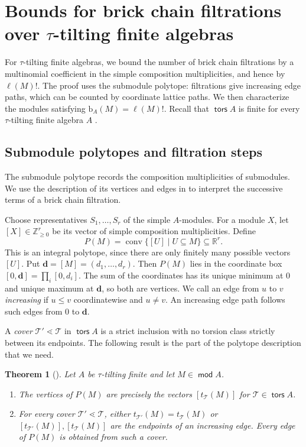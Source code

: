 \documentclass[a4paper,reqno,10pt]{amsart}
\newtheorem{theorem}{Theorem}[section]
\theoremstyle{definition}
\numberwithin{equation}{section}
\DeclareMathOperator{\tors}{\mathsf{tors}}
\DeclareMathOperator{\modu}{\mathsf{mod}}
\newcommand{\T}{\mathcal T}
\newcommand{\bcount}{\mathrm b}
\begin{document}
\section{Bounds for brick chain filtrations over \texorpdfstring{$\tau$}{tau}-tilting finite algebras}\label{sec:finite-type}

For $\tau$-tilting finite algebras, we bound the number of brick chain
filtrations by a multinomial coefficient in the simple composition
multiplicities, and hence by $\ell(M)!$. The proof uses the submodule
polytope: filtrations give increasing edge paths, which can be counted
by coordinate lattice paths. We then characterize the modules satisfying
$\bcount_A(M)=\ell(M)!$.
Recall that $\tors A$ is finite for every $\tau$-tilting finite algebra
$A$ \cite[Theorem~3.8]{DIJ}.

\subsection{Submodule polytopes and filtration steps}

The submodule polytope records the composition multiplicities of
submodules. We use the description of its vertices and edges in
\cite[Section~5.3]{AHIKM} to interpret the successive terms of a
brick chain filtration.

Choose representatives $S_1,\ldots,S_r$ of the simple $A$-modules.
For a module $X$, let $[X]\in\mathbb Z_{\geq0}^r$ be its vector of
simple composition multiplicities. Define
\[
 P(M)=\operatorname{conv}\{[U]\mid U\subseteq M\}
       \subseteq\mathbb R^r.
\]
This is an integral polytope, since there are only finitely many
possible vectors $[U]$. Put $\mathbf d=[M]=(d_1,\ldots,d_r)$. Then $P(M)$ lies in the
coordinate box $[0,\mathbf d]=\prod_i[0,d_i]$. The sum of the
coordinates has its unique minimum at $0$ and unique maximum at
$\mathbf d$, so both are vertices. We call an edge from $u$ to $v$
\emph{increasing} if $u\leq v$ coordinatewise and $u\ne v$.
An increasing edge path follows such edges from $0$ to $\mathbf d$.

A \emph{cover} $\T'\lessdot\T$ in $\tors A$ is a strict inclusion
with no torsion class strictly between its endpoints. The following
result is the part of the polytope description that we need.

\begin{theorem}[{\cite[Theorem~5.23(b),(c)]{AHIKM}}]\label{thm:polytope-torsion}
Let $A$ be $\tau$-tilting finite and let $M\in\modu A$.
\begin{enumerate}
\item\label{item:polytope-vertices}
The vertices of $P(M)$ are precisely the vectors $[t_\T(M)]$ for
$\T\in\tors A$.
\item\label{item:polytope-edges}
For every cover $\T'\lessdot\T$, either $t_{\T'}(M)=t_\T(M)$ or
$[t_{\T'}(M)],[t_\T(M)]$ are the endpoints of an increasing edge.
Every edge of $P(M)$ is obtained from such a cover.
\end{enumerate}
\end{theorem}
\end{document}
